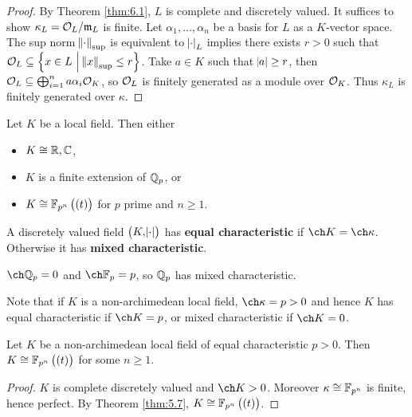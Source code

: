 \begin{proof}
By Theorem \ref{thm:6.1}, $ L $ is complete and discretely valued. It suffices to show $ \kappa_L = \mathcal{O}_L / \mathfrak{m}_L $ is finite. Let $ \alpha_1, \dots, \alpha_n $ be a basis for $ L $ as a $ K $-vector space. The sup norm $ \norm{\cdot}_{\sup} $ is equivalent to $ \abs{\cdot}_L $ implies there exists $ r > 0 $ such that $ \OOO_L \subseteq \cbr{x \in L \st \norm{x}_{\sup} \le r} $. Take $ a \in K $ such that $ \abs{a} \ge r $, then $ \mathcal{O}_L \subseteq \bigoplus_{i = 1}^n a\alpha_i\mathcal{O}_K $, so $ \mathcal{O}_L $ is finitely generated as a module over $ \mathcal{O}_K $. Thus $ \kappa_L $ is finitely generated over $ \kappa $.
\end{proof}

\begin{theorem}
\label{thm:8.2}
Let $ K $ be a local field. Then either
\begin{itemize}
\item $ K \cong \mathbb{R}, \mathbb{C} $,
\item $ K $ is a finite extension of $ \mathbb{Q}_p $, or
\item $ K \cong \FF_{p^n}\br{\br{t}} $ for $ p $ prime and $ n \ge 1 $.
\end{itemize}
\end{theorem}

\begin{definition}
A discretely valued field $ \br{K, \abs{\cdot}} $ has \textbf{equal characteristic} if $ \ch K = \ch \kappa $. Otherwise it has \textbf{mixed characteristic}.
\end{definition}

\begin{example*}
$ \ch \QQ_p = 0 $ and $ \ch \FF_p = p $, so $ \mathbb{Q}_p $ has mixed characteristic.
\end{example*}

Note that if $ K $ is a non-archimedean local field, $ \ch \kappa = p > 0 $ and hence $ K $ has equal characteristic if $ \ch K = p $, or mixed characteristic if $ \ch K = 0 $.

\begin{theorem}
\label{thm:8.4}
Let $ K $ be a non-archimedean local field of equal characteristic $ p > 0 $. Then $ K \cong \FF_{p^n}\br{\br{t}} $ for some $ n \ge 1 $.
\end{theorem}

\begin{proof}
$ K $ is complete discretely valued and $ \ch K > 0 $. Moreover $ \kappa \cong \mathbb{F}_{p^n} $ is finite, hence perfect. By Theorem \ref{thm:5.7}, $ K \cong \FF_{p^n}\br{\br{t}} $.
\end{proof}

